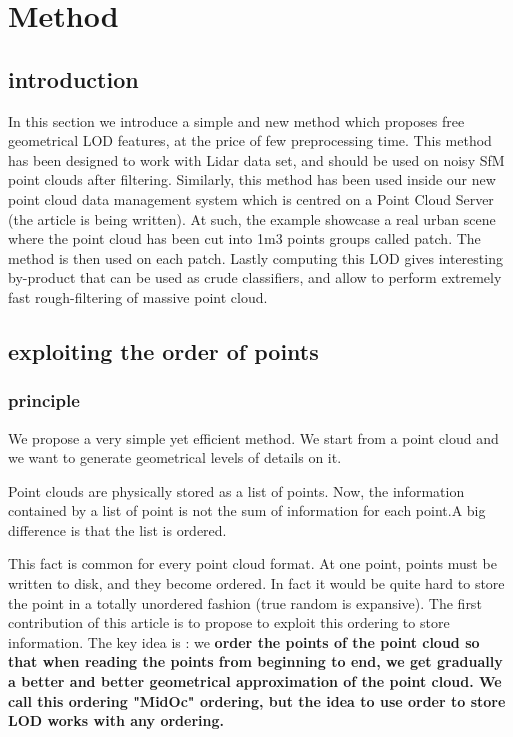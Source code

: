 

\section{Method}
	\subsection{introduction}
	 	In this section we introduce a simple and new method which proposes free geometrical LOD features, at the price of few preprocessing time.
	 	This method has been designed to work with Lidar data set, and should be used on noisy SfM point clouds after filtering.
	 	Similarly, this method has been used inside our new point cloud data management system which is centred on a Point Cloud Server (the article is being written).
	 	At such, the example showcase a real urban scene where the point cloud has been cut into 1m3 points groups called patch.
	 	The method is then used on each patch.
	 	Lastly computing this LOD gives interesting by-product that can be used as crude classifiers, and allow to perform extremely fast rough-filtering of massive point cloud. 
	 	 
	\subsection{exploiting the order of points }
		\subsubsection{principle}
			We propose a very simple yet efficient method.
			We start from a point cloud and we want to generate geometrical levels of details on it.
			
			Point clouds are physically stored as a list of points. 
			Now, the information contained by a list of point is not the sum of information for each point.A big difference is that the list is ordered.
			
			This fact is common for every point cloud format. At one point, points must be written to disk, and they become ordered. In fact it would be quite hard to store the point in a totally unordered fashion (true random is expansive).
			The first contribution of this article is to propose to exploit this ordering to store information.
			The key idea is : we \bf{order} the points of the point cloud so that when reading the points from beginning to end, we get gradually a better and better geometrical approximation of the point cloud. We call this ordering "MidOc" ordering, but the idea to use order to store LOD works with any ordering.
			

